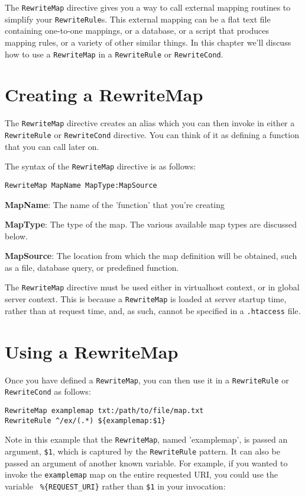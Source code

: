 The \verb~RewriteMap~ directive gives you a way to call external mapping routines to simplify your \verb~RewriteRule~s. This external mapping can be a flat text file containing one-to-one mappings, or a database, or a script that produces mapping rules, or a variety of other similar things. In this chapter we'll discuss how to use a \verb~RewriteMap~ in a \verb~RewriteRule~ or \verb~RewriteCond~.

\section{Creating a RewriteMap}

The \verb~RewriteMap~ directive creates an alias which you can then invoke in either a \verb~RewriteRule~ or \verb~RewriteCond~ directive. You can think of it as defining a function that you can call later on.

The syntax of the \verb~RewriteMap~ directive is as follows:

\begin{verbatim}
RewriteMap MapName MapType:MapSource
\end{verbatim}

\textbf{MapName}: The name of the 'function' that you're creating

\textbf{MapType}: The type of the map. The various available map types are discussed below.

\textbf{MapSource}: The location from which the map definition will be obtained, such as a file, database query, or predefined function.

The \verb~RewriteMap~ directive must be used either in virtualhost context, or in global server context. This is because a \verb~RewriteMap~ is loaded at server startup time, rather than at request time, and, as such, cannot be specified in a \verb~.htaccess~ file.

\section{Using a RewriteMap}

Once you have defined a \verb~RewriteMap~, you can then use it in a \verb~RewriteRule~ or \verb~RewriteCond~ as follows:

\begin{verbatim}
RewriteMap examplemap txt:/path/to/file/map.txt
RewriteRule ^/ex/(.*) ${examplemap:$1}
\end{verbatim}

Note in this example that the \verb~RewriteMap~, named 'examplemap', is passed an argument, \verb~$1~, which is captured by the \verb~RewriteRule~ pattern. It can also be passed an argument of another known variable. For example, if you wanted to invoke the \verb~examplemap~ map on the entire requested URI, you could use the variable \verb~ %{REQUEST_URI}~ rather than \verb~$1~ in your invocation:

